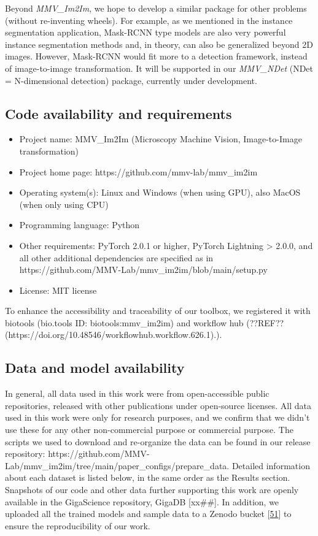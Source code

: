 Beyond \emph{MMV\_Im2Im}, we hope to develop a similar package for other problems (without re-inventing wheels). For example, as we mentioned in the instance segmentation application, Mask-RCNN type models are also very powerful instance segmentation methods and, in theory, can also be generalized beyond 2D images. However, Mask-RCNN would fit more to a detection framework, instead of image-to-image transformation. It will be supported in our \emph{MMV\_NDet} (NDet = N-dimensional detection) package, currently under development.

\hypertarget{code-availability-and-requirements}{%
\subsection{Code availability and requirements}\label{code-availability-and-requirements}}

\begin{itemize}
\item
  Project name: MMV\_Im2Im (Microscopy Machine Vision, Image-to-Image transformation)
\item
  Project home page: https://github.com/mmv-lab/mmv\_im2im
\item
  Operating system(s): Linux and Windows (when using GPU), also MacOS (when only using CPU)
\item
  Programming language: Python
\item
  Other requirements: PyTorch 2.0.1 or higher, PyTorch Lightning \textgreater{} 2.0.0, and all other additional dependencies are specified as in https://github.com/MMV-Lab/mmv\_im2im/blob/main/setup.py
\item
  License: MIT license
\end{itemize}

To enhance the accessibility and traceability of our toolbox, we registered it with biotools (bio.tools ID: biotools:mmv\_im2im) and workflow hub (??REF?? (https://doi.org/10.48546/workflowhub.workflow.626.1).).

\hypertarget{data-and-model-availability}{%
\subsection{Data and model availability}\label{data-and-model-availability}}

In general, all data used in this work were from open-accessible public repositories, released with other publications under open-source licenses. All data used in this work were only for research purposes, and we confirm that we didn't use these for any other non-commercial purpose or commercial purpose. The scripts we used to download and re-organize the data can be found in our release repository: https://github.com/MMV-Lab/mmv\_im2im/tree/main/paper\_configs/prepare\_data. Detailed information about each dataset is listed below, in the same order as the Results section. Snapshots of our code and other data further supporting this work are openly available in the GigaScience repository, GigaDB {[}xx\#\#{]}. In addition, we uploaded all the trained models and sample data to a Zenodo bucket {[}\protect\hyperlink{ref-FBoj3fXM}{51}{]} to ensure the reproducibility of our work.

